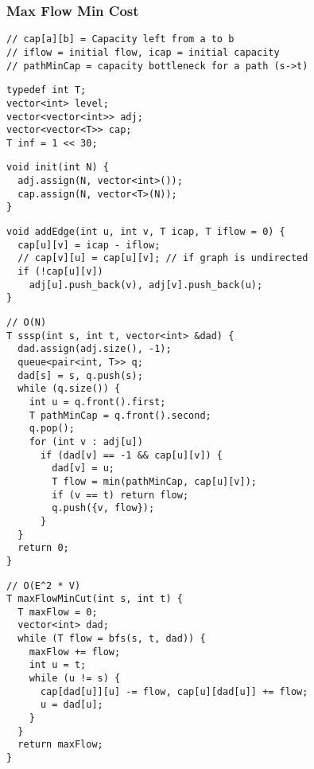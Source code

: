 \documentclass[twoside]{article}
\begin{document}
\begin{multicols*}{2}
\subsubsection*{Max Flow Min Cost}
\begin{verbatim}
// cap[a][b] = Capacity left from a to b
// iflow = initial flow, icap = initial capacity
// pathMinCap = capacity bottleneck for a path (s->t)
\end{verbatim}
\vspace{-12pt}
\begin{verbatim}
typedef int T;
vector<int> level;
vector<vector<int>> adj;
vector<vector<T>> cap;
T inf = 1 << 30;
\end{verbatim}
\vspace{-12pt}
\begin{verbatim}
void init(int N) {
  adj.assign(N, vector<int>());
  cap.assign(N, vector<T>(N));
}
\end{verbatim}
\vspace{-12pt}
\begin{verbatim}
void addEdge(int u, int v, T icap, T iflow = 0) {
  cap[u][v] = icap - iflow;
  // cap[v][u] = cap[u][v]; // if graph is undirected
  if (!cap[u][v])
    adj[u].push_back(v), adj[v].push_back(u);
}
\end{verbatim}
\vspace{-12pt}
\begin{verbatim}
// O(N)
T sssp(int s, int t, vector<int> &dad) {
  dad.assign(adj.size(), -1);
  queue<pair<int, T>> q;
  dad[s] = s, q.push(s);
  while (q.size()) {
    int u = q.front().first;
    T pathMinCap = q.front().second;
    q.pop();
    for (int v : adj[u])
      if (dad[v] == -1 && cap[u][v]) {
        dad[v] = u;
        T flow = min(pathMinCap, cap[u][v]);
        if (v == t) return flow;
        q.push({v, flow});
      }
  }
  return 0;
}
\end{verbatim}
\vspace{-12pt}
\begin{verbatim}
// O(E^2 * V)
T maxFlowMinCut(int s, int t) {
  T maxFlow = 0;
  vector<int> dad;
  while (T flow = bfs(s, t, dad)) {
    maxFlow += flow;
    int u = t;
    while (u != s) {
      cap[dad[u]][u] -= flow, cap[u][dad[u]] += flow;
      u = dad[u];
    }
  }
  return maxFlow;
}
\end{verbatim}


\end{multicols*}
\end{document}
